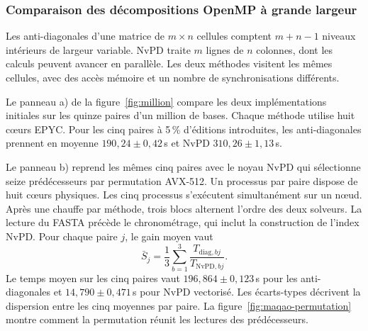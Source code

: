 \subsubsection{Comparaison des décompositions OpenMP à grande largeur}
Les anti-diagonales d’une matrice de \(m\times n\) cellules comptent \(m+n-1\) niveaux intérieurs de largeur variable. NvPD traite \(m\) lignes de \(n\) colonnes, dont les calculs peuvent avancer en parallèle. Les deux méthodes visitent les mêmes cellules, avec des accès mémoire et un nombre de synchronisations différents.

Le panneau a) de la figure~\ref{fig:million} compare les deux implémentations initiales sur les quinze paires d’un million de bases. Chaque méthode utilise huit cœurs EPYC. Pour les cinq paires à 5\,\% d’éditions introduites, les anti-diagonales prennent en moyenne \(190{,}24\pm0{,}42\)\,s et NvPD \(310{,}26\pm1{,}13\)\,s.

Le panneau b) reprend les mêmes cinq paires avec le noyau NvPD qui sélectionne seize prédécesseurs par permutation AVX-512. Un processus par paire dispose de huit cœurs physiques. Les cinq processus s’exécutent simultanément sur un nœud. Après une chauffe par méthode, trois blocs alternent l’ordre des deux solveurs. La lecture du FASTA précède le chronométrage, qui inclut la construction de l’index NvPD. Pour chaque paire \(j\), le gain moyen vaut
\[
  \bar S_j=\frac{1}{3}\sum_{b=1}^{3}\frac{T_{\mathrm{diag},bj}}{T_{\mathrm{NvPD},bj}} .
\]
Le temps moyen sur les cinq paires vaut \(196{,}864\pm0{,}123\)\,s pour les anti-diagonales et \(14{,}790\pm0{,}471\)\,s pour NvPD vectorisé. Les écarts-types décrivent la dispersion entre les cinq moyennes par paire. La figure~\ref{fig:maqao-permutation} montre comment la permutation réunit les lectures des prédécesseurs.

